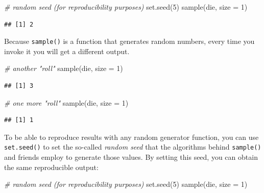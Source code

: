 \documentclass[
]{book}
\newenvironment{Shaded}{\begin{snugshade}}{\end{snugshade}}
\newcommand{\AttributeTok}[1]{\textcolor[rgb]{0.77,0.63,0.00}{#1}}
\newcommand{\CommentTok}[1]{\textcolor[rgb]{0.56,0.35,0.01}{\textit{#1}}}
\newcommand{\DecValTok}[1]{\textcolor[rgb]{0.00,0.00,0.81}{#1}}
\newcommand{\FunctionTok}[1]{\textcolor[rgb]{0.00,0.00,0.00}{#1}}
\newcommand{\NormalTok}[1]{#1}
\begin{document}
\begin{Shaded}
\begin{Highlighting}[]
\CommentTok{\# random seed (for reproducibility purposes)}
\FunctionTok{set.seed}\NormalTok{(}\DecValTok{5}\NormalTok{)}
\FunctionTok{sample}\NormalTok{(die, }\AttributeTok{size =} \DecValTok{1}\NormalTok{)}
\end{Highlighting}
\end{Shaded}

\begin{verbatim}
## [1] 2
\end{verbatim}

Because \texttt{sample()} is a function that generates random numbers, every time
you invoke it you will get a different output.

\begin{Shaded}
\begin{Highlighting}[]
\CommentTok{\# another "roll"}
\FunctionTok{sample}\NormalTok{(die, }\AttributeTok{size =} \DecValTok{1}\NormalTok{)}
\end{Highlighting}
\end{Shaded}

\begin{verbatim}
## [1] 3
\end{verbatim}

\begin{Shaded}
\begin{Highlighting}[]
\CommentTok{\# one more "roll"}
\FunctionTok{sample}\NormalTok{(die, }\AttributeTok{size =} \DecValTok{1}\NormalTok{)}
\end{Highlighting}
\end{Shaded}

\begin{verbatim}
## [1] 1
\end{verbatim}

To be able to reproduce results with any random generator function, you can use
\texttt{set.seed()} to set the so-called \emph{random seed} that the algorithms behind
\texttt{sample()} and friends employ to generate those values. By setting this seed,
you can obtain the same reproducible output:

\begin{Shaded}
\begin{Highlighting}[]
\CommentTok{\# random seed (for reproducibility purposes)}
\FunctionTok{set.seed}\NormalTok{(}\DecValTok{5}\NormalTok{)}
\FunctionTok{sample}\NormalTok{(die, }\AttributeTok{size =} \DecValTok{1}\NormalTok{)}
\end{Highlighting}
\end{Shaded}
\end{document}

